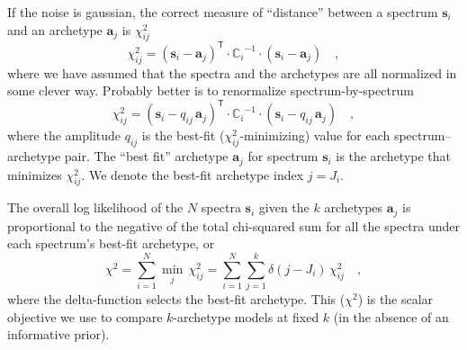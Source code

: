 \documentclass[12pt]{article}
\newcommand{\ampij}{q_{ij}}
\newcommand{\chisq}{\chi^2}
\newcommand{\chisqij}{\chisq_{ij}}
\newcommand{\Mvector}[1]{\mathbf{#1}}
\newcommand{\point}{\Mvector{s}}
\newcommand{\spectrumi}{\point_i}
\newcommand{\archetypej}{\Mvector{a}_j}
\newcommand{\Mmatrix}[1]{\mathbb{#1}}
\newcommand{\covari}{\Mmatrix{C}_i}
\newcommand{\inverse}[1]{{#1}^{-1}}
\newcommand{\invcovari}{\inverse{\covari}}
\newcommand{\transpose}[1]{{#1}^{\mathsf{T}}}
\newcommand{\minover}[1]{\min_{#1}\,}
\begin{document}
If the noise is gaussian, the correct measure of ``distance'' between
a spectrum $\spectrumi$ and an archetype $\archetypej$ is $\chisqij$
\begin{equation}
\chisqij = \transpose{(\spectrumi-\archetypej)}
           \cdot\invcovari\cdot(\spectrumi-\archetypej) \quad ,
\end{equation}
where we have assumed that the spectra and the archetypes are all
normalized in some clever way.  Probably better is to renormalize
spectrum-by-spectrum
\begin{equation}
\chisqij = \transpose{(\spectrumi-\ampij\,\archetypej)}
           \cdot\invcovari\cdot(\spectrumi-\ampij\,\archetypej) \quad ,
\end{equation}
where the amplitude $\ampij$ is the best-fit ($\chisqij$-minimizing)
value for each spectrum--archetype pair.  The ``best fit'' archetype
$\archetypej$ for spectrum $\spectrumi$ is the archetype that
minimizes $\chisqij$.  We denote the best-fit archetype index $j=J_i$.

The overall log likelihood of the $N$ spectra $\spectrumi$ given the
$k$ archetypes $\archetypej$ is proportional to the negative of the
total chi-squared sum for all the spectra under each spectrum's
best-fit archetype, or
\begin{equation}
\chisq = \sum_{i=1}^{N} \minover{j}\chisqij
       = \sum_{i=1}^{N}\sum_{j=1}^{k} \delta(j-J_i)\,\chisqij \quad ,
\end{equation}
where the delta-function selects the best-fit archetype.  This
($\chisq$) is the scalar objective we use to compare $k$-archetype
models at fixed $k$ (in the absence of an informative prior).
\end{document}
